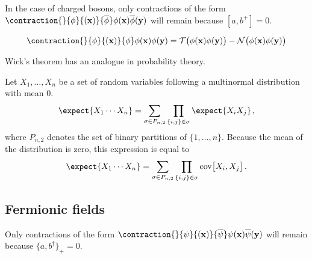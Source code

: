     \begin{remark}
        In the case of charged bosons, only contractions of the form $\contraction{}{\phi}{(\mathbf{x})}{\overline\phi}\phi(\mathbf{x})\overline\phi(\mathbf{y})$ will remain because $[a,b^+]=0$.
    \end{remark}

    \begin{result}
        \begin{gather}
            \contraction{}{\phi}{(\mathbf{x})}{\phi}\phi(\mathbf{x})\phi(\mathbf{y}) = \mathcal{T}\bigl(\phi(\mathbf{x})\phi(\mathbf{y})\bigr) - \mathcal{N}\bigl(\phi(\mathbf{x})\phi(\mathbf{y})\bigr)
        \end{gather}
    \end{result}

    Wick's theorem has an analogue in probability theory.
    \begin{theorem}[Isserlis]
        Let $X_1,\ldots,X_n$ be a set of random variables following a multinormal distribution with mean 0.
        \begin{gather}
            \expect{X_1\cdots X_n} = \sum_{\sigma\in P_{n,2}}\prod_{\{i,j\}\in\sigma}\expect{X_iX_j}\,,
        \end{gather}
        where $P_{n,2}$ denotes the set of binary partitions of $\{1,\ldots,n\}$. Because the mean of the distribution is zero, this expression is equal to
        \begin{gather}
            \expect{X_1\cdots X_n} = \sum_{\sigma\in P_{n,2}}\prod_{\{i,j\}\in\sigma}\mathrm{cov}\bigl[X_i,X_j\bigr]\,.
        \end{gather}
    \end{theorem}

\subsection{Fermionic fields}

    \begin{remark}
        Only contractions of the form $\contraction{}{\psi}{(\mathbf{x})}{\overline\psi}\psi(\mathbf{x})\overline\psi(\mathbf{y})$ will remain because $\{a,b^\dag\}_+=0$.
    \end{remark}

